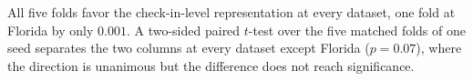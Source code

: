 \begin{table}[htbp]
\vspace{2pt}
{\footnotesize All five folds favor the check-in-level representation at every dataset, one fold at
Florida by only $0.001$. A two-sided paired $t$-test over the five matched folds of one seed separates
the two columns at every dataset except Florida ($p=0.07$), where the direction is unanimous but the
difference does not reach significance.}
\end{table}
